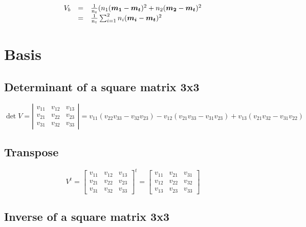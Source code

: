 \documentclass{article}
\begin{document}
\[
\begin{array}{lcl}
V_b & = & \frac{1}{n_t}(n_1 (\mbox{\boldmath$m_1$} - \mbox{\boldmath$m_t$})^2 +
 n_2 (\mbox{\boldmath$m_2$} - \mbox{\boldmath$m_t$})^2 \\
    & = & \frac{1}{n_t} \sum_{i=1}^2 n_i 
 (\mbox{\boldmath$m_i$} - \mbox{\boldmath$m_t$})^2
\end{array}
\]

\section{Basis}

\subsection{Determinant of a square matrix 3x3}

\[
\det{V} =
\left|\begin{array}{ccc}
 v_{11} & v_{12} & v_{13} \\
 v_{21} & v_{22} & v_{23} \\
 v_{31} & v_{32} & v_{33}
\end{array}\right|
=
v_{11}(v_{22}v_{33} - v_{32}v_{23})
- v_{12}(v_{21}v_{33} - v_{31}v_{23})
+ v_{13}(v_{21}v_{32} - v_{31}v_{22})
\]

\subsection{Transpose}

\[
V^t =
\left[\begin{array}{ccc}
 v_{11} & v_{12} & v_{13} \\
 v_{21} & v_{22} & v_{23} \\
 v_{31} & v_{32} & v_{33}
\end{array}\right]^t
=
\left[\begin{array}{ccc}
 v_{11} & v_{21} & v_{31} \\
 v_{12} & v_{22} & v_{32} \\
 v_{13} & v_{23} & v_{33}
\end{array}\right]
\]

\subsection{Inverse of a square matrix 3x3}
\end{document}
